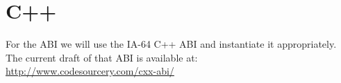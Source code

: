 


\section{C++\label{section-cpp}}

For the  ABI we will use the IA-64 C++ ABI and instantiate it
appropriately.  The current draft of that ABI is available at:\\
\url{http://www.codesourcery.com/cxx-abi/}


